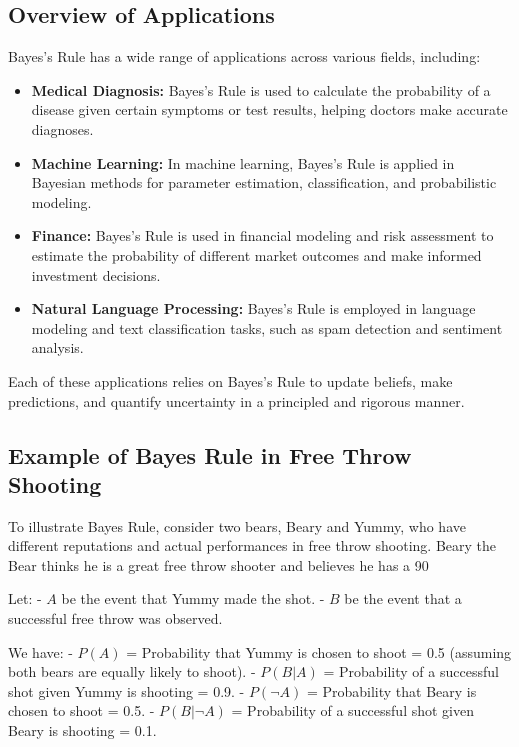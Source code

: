 \documentclass[12pt]{book} %
\begin{document}
\subsection{Overview of Applications}
Bayes's Rule has a wide range of applications across various fields, including:
\begin{itemize}
    \item \textbf{Medical Diagnosis:} Bayes's Rule is used to calculate the probability of a disease given certain symptoms or test results, helping doctors make accurate diagnoses.
    \item \textbf{Machine Learning:} In machine learning, Bayes's Rule is applied in Bayesian methods for parameter estimation, classification, and probabilistic modeling.
    \item \textbf{Finance:} Bayes's Rule is used in financial modeling and risk assessment to estimate the probability of different market outcomes and make informed investment decisions.
    \item \textbf{Natural Language Processing:} Bayes's Rule is employed in language modeling and text classification tasks, such as spam detection and sentiment analysis.
\end{itemize}
Each of these applications relies on Bayes's Rule to update beliefs, make predictions, and quantify uncertainty in a principled and rigorous manner.

\subsection{Example of Bayes Rule in Free Throw Shooting}

To illustrate Bayes Rule, consider two bears, Beary and Yummy, who have different reputations and actual performances in free throw shooting. Beary the Bear thinks he is a great free throw shooter and believes he has a 90%

Let:
- \( A \) be the event that Yummy made the shot.
- \( B \) be the event that a successful free throw was observed.

We have:
- \( P(A) \) = Probability that Yummy is chosen to shoot = 0.5 (assuming both bears are equally likely to shoot).
- \( P(B|A) \) = Probability of a successful shot given Yummy is shooting = 0.9.
- \( P(\neg A) \) = Probability that Beary is chosen to shoot = 0.5.
- \( P(B|\neg A) \) = Probability of a successful shot given Beary is shooting = 0.1.
\end{document}
